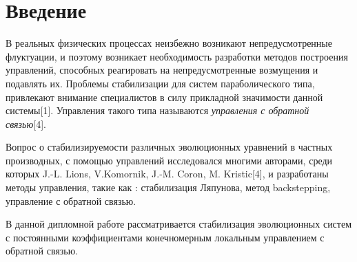 \section*{Введение}
\vspace{1em}

В реальных физических процессах неизбежно возникают непредусмотренные флуктуации, и поэтому возникает необходимость разработки методов построения управлений, способных реагировать на непредусмотренные возмущения и подавлять их. Проблемы стабилизации для систем параболического типа, привлекают внимание специалистов в силу прикладной значимости данной системы[1]. Управления такого типа называются \emph{управления с обратной связью}[4].

Вопрос о стабилизируемости различных эволюционных уравнений в частных производных, с помощью управлений исследовался многими авторами, среди которых J.-L. Lions, V.Komornik, J.-M. Coron, M. Kristic[4], и разработаны методы управления, такие как : стабилизация Ляпунова, метод backstepping, управление с обратной связью.

В данной дипломной работе рассматривается стабилизация эволюционных систем с постоянными коэффициентами конечномерным локальным управлением с обратной связью.
